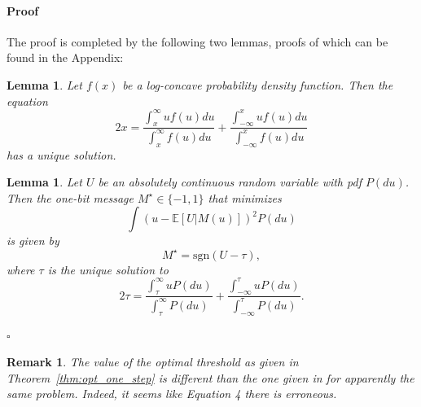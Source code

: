 \documentclass[letterpaper, conference]{IEEEtran}      %
\newtheorem{lem}[thm]{\bf {Lemma}}
\newtheorem{rem}{\bf {Remark}}
\newenvironment{proof}{\paragraph*{Proof}}{\hfill$\square$ \newline}
\newcommand{\sgn}{\mathrm{sgn} }
\begin{document}
\begin{proof}
The proof is completed by the following two lemmas, proofs of which can be found in the Appendix:
\begin{lem} \label{lem:unique}
Let $f(x)$ be a log-concave probability density function. Then the equation 
\begin{equation}
\label{eq:lem_fixed_point}
2x = \frac{\int_x^\infty uf(u)du}{\int_x^\infty f(u)du} + \frac{\int_{-\infty}^x uf(u)du}{\int_{-\infty}^x f(u)du} 
\end{equation}
has a unique solution.
\end{lem}
\begin{lem} \label{lem:adaptive}
Let $U$ be an absolutely continuous random variable with
pdf $P(du)$. Then the one-bit message $M^\star\in \{-1,1\}$ that minimizes
\[
\int \left( u - \mathbb E[U|M(u)]  \right)^2 P(du)
\]
is given by
\[
M^\star  =  \sgn(U - \tau),
\]
where $\tau$ is the unique solution to
 \[
2 \tau = \frac{\int_{\tau}^\infty u P(du)} {\int_{\tau}^\infty P(du)} + \frac{\int_{-\infty}^{\tau} u P(du)}{\int_{-\infty}^{\tau} P(du)}.
\]
\end{lem}
\end{proof}

\begin{rem}
The value of the optimal threshold as given in Theorem~\ref{thm:opt_one_step} is different than the one given in \cite[Eq. 5]{1619423} for apparently the same problem. Indeed, it seems like Equation 4 there is erroneous. 
\end{rem}
\end{document}
